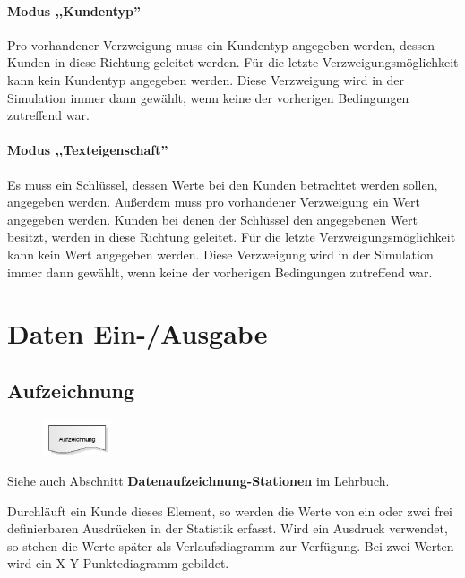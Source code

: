 \subsubsection*{Modus ,,Kundentyp''}

Pro vorhandener Verzweigung muss ein Kundentyp angegeben werden, dessen Kunden in diese Richtung
geleitet werden. Für die letzte Verzweigungsmöglichkeit kann kein Kundentyp angegeben werden. Diese Verzweigung
wird in der Simulation immer dann gewählt, wenn keine der vorherigen Bedingungen zutreffend war.

\subsubsection*{Modus ,,Texteigenschaft''}

Es muss ein Schlüssel, dessen Werte bei den Kunden betrachtet werden sollen, angegeben werden.
Außerdem muss pro vorhandener Verzweigung ein Wert angegeben werden. Kunden bei denen der Schlüssel
den angegebenen Wert besitzt, werden in diese Richtung geleitet. Für die letzte Verzweigungsmöglichkeit
kann kein Wert angegeben werden. Diese Verzweigung wird in der Simulation immer dann gewählt,
wenn keine der vorherigen Bedingungen zutreffend war.





\chapter{Daten Ein-/Ausgabe}

\section{Aufzeichnung}
\label{ref:ModelElementRecord}

\begin{figure}
\vspace{-22pt}
\includegraphics[width=2cm]{imageModelElementRecord.png}
\vspace{-22pt}
\end{figure}

Siehe auch Abschnitt \textbf{Datenaufzeichnung-Stationen} im Lehrbuch.

Durchläuft ein Kunde dieses Element, so werden die Werte von ein oder zwei frei definierbaren Ausdrücken
in der Statistik erfasst. Wird ein Ausdruck verwendet, so stehen die Werte später als Verlaufsdiagramm
zur Verfügung. Bei zwei Werten wird ein X-Y-Punktediagramm gebildet.

